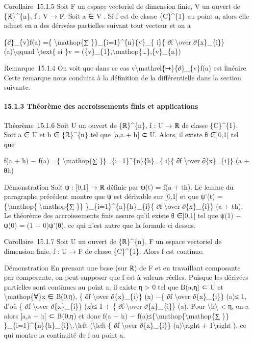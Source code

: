 Corollaire~15.1.5 Soit F un espace vectoriel de dimension finie, V un
ouvert de \{ℝ\}\^{}\{n\}, f : V → F. Soit a ∈ V . Si f est de classe
\{C\}\^{}\{1\} au point a, alors elle admet en a des dérivées partielles
suivant tout vecteur et on a

\{∂\}\_\{v\}f(a) =\{ \textbackslash{}mathop\{∑
\}\}\_\{i=1\}\^{}\{n\}\{v\}\_\{ i\}\{ ∂f \textbackslash{}over
∂\{x\}\_\{i\}\} (a)\textbackslash{}qquad \textbackslash{}text\{ si \}v =
(\{v\}\_\{1\},\textbackslash{}mathop\{\ldots{}\},\{v\}\_\{n\})

Remarque~15.1.4 On voit que dans ce cas
v\textbackslash{}mathrel\{↦\}\{∂\}\_\{v\}f(a) est linéaire. Cette
remarque nous conduira à la définition de la différentielle dans la
section suivante.

\paragraph{15.1.3 Théorème des accroissements finis et applications}

Théorème~15.1.6 Soit U un ouvert de \{ℝ\}\^{}\{n\}, f : U → ℝ de classe
\{C\}\^{}\{1\}. Soit a ∈ U et h ∈ \{ℝ\}\^{}\{n\} tel que {[}a,a + h{]} ⊂
U. Alors, il existe θ ∈{]}0,1{[} tel que

f(a + h) − f(a) =\{ \textbackslash{}mathop\{∑
\}\}\_\{i=1\}\^{}\{n\}\{h\}\_\{ i\}\{ ∂f \textbackslash{}over
∂\{x\}\_\{i\}\} (a + θh)

Démonstration Soit ψ : {[}0,1{]} → ℝ définie par ψ(t) = f(a + th). Le
lemme du paragraphe précédent montre que ψ est dérivable sur {[}0,1{]}
et que ψ'(t) =\{\textbackslash{}mathop\{ \textbackslash{}mathop\{∑ \}\}
\}\_\{i=1\}\^{}\{n\}\{h\}\_\{i\}\{ ∂f \textbackslash{}over
∂\{x\}\_\{i\}\} (a + th). Le théorème des accroissements finis assure
qu'il existe θ ∈{]}0,1{[} tel que ψ(1) − ψ(0) = (1 − 0)ψ'(θ), ce qui
n'est autre que la formule ci dessus.

Corollaire~15.1.7 Soit U un ouvert de \{ℝ\}\^{}\{n\}, F un espace
vectoriel de dimension finie, f : U → F de classe \{C\}\^{}\{1\}. Alors
f est continue.

Démonstration En prenant une base (sur ℝ) de F et en travaillant
composante par composante, on peut supposer que f est à valeurs réelles.
Puisque les dérivées partielles sont continues au point a, il existe η
\textgreater{} 0 tel que B(a,η) ⊂ U et \textbackslash{}mathop\{∀\}x ∈
B(0,η), \textbar{}\{ ∂f \textbackslash{}over ∂\{x\}\_\{i\}\} (x) −\{ ∂f
\textbackslash{}over ∂\{x\}\_\{i\}\} (a)\textbar{}≤ 1, d'où \textbar{}\{
∂f \textbackslash{}over ∂\{x\}\_\{i\}\} (x)\textbar{}≤ 1 + \textbar{}\{
∂f \textbackslash{}over ∂\{x\}\_\{i\}\} (a)\textbar{}. Pour
\textbackslash{}\textbar{}h\textbackslash{}\textbar{} \textless{} η, on
a alors {[}a,a + h{]} ⊂ B(0,η) et donc \textbar{}f(a + h) −
f(a)\textbar{}≤\{\textbackslash{}mathop\{\textbackslash{}mathop\{∑ \}\}
\}\_\{i=1\}\^{}\{n\}\textbar{}\{h\}\_\{i\}\textbar{}\textbackslash{},\textbackslash{}left
(\textbackslash{}left \textbar{}\{ ∂f \textbackslash{}over
∂\{x\}\_\{i\}\} (a)\textbackslash{}right \textbar{} +
1\textbackslash{}right ), ce qui montre la continuité de f au point a.

